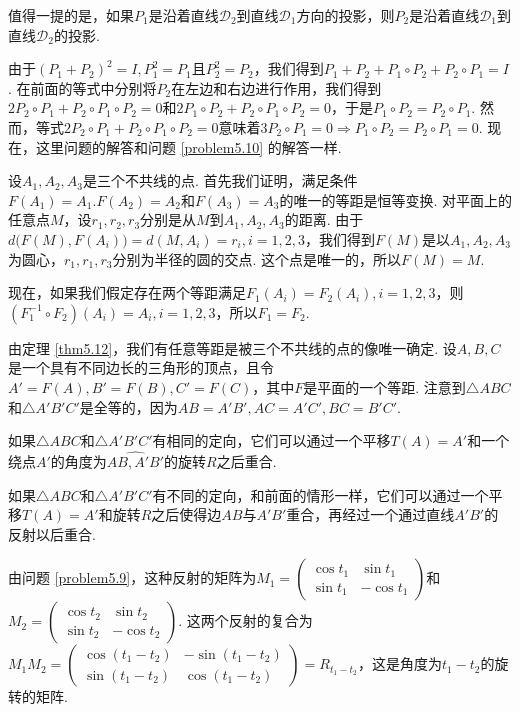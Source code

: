 \begin{remark}
  值得一提的是，如果$P_1$是沿着直线$\mathscr D_2$到直线$\mathscr D_1$方向的投影，则$P_2$是沿着直线$\mathscr D_1$到直线$\mathscr D_2$的投影.
\end{remark}

\begin{solution}
  由于$(P_1+P_2)^2=I,P_1^2=P_1$且$P_2^2=P_2$，我们得到$P_1+P_2+P_1\circ P_2+P_2\circ P_1=I$. 在前面的等式中分别将$P_2$在左边和右边进行作用，我们得到$2P_2\circ P_1+P_2\circ P_1\circ P_2=0$和$2P_1\circ P_2+P_2\circ P_1\circ P_2=0$，于是$P_1\circ P_2=P_2\circ P_1$. 然而，等式$2P_2\circ P_1+P_2\circ P_1\circ P_2=0$意味着$3P_2\circ P_1=0\Rightarrow P_1\circ P_2=P_2\circ P_1=0$. 现在，这里问题的解答和问题 \ref{problem5.10} 的解答一样.
\end{solution}

\begin{solution}
  设$A_1,A_2,A_3$是三个不共线的点. 首先我们证明，满足条件$F(A_1)=A_1.F(A_2)=A_2$和$F(A_3)=A_3$的唯一的等距是恒等变换. 对平面上的任意点$M$，设$r_1,r_2,r_3$分别是从$M$到$A_1,A_2,A_3$的距离. 由于$d\big(F(M),F(A_i)\big)=d(M,A_i)=r_i,i=1,2,3$，我们得到$F(M)$是以$A_1,A_2,A_3$为圆心，$r_1,r_1,r_3$分别为半径的圆的交点. 这个点是唯一的，所以$F(M)=M$.

  现在，如果我们假定存在两个等距满足$F_1(A_i)=F_2(A_i),i=1,2,3$，则$(F_1^{-1}\circ F_2)(A_i)=A_i,i=1,2,3$，所以$F_1=F_2$.
\end{solution}

\begin{solution}
  由定理 \ref{thm5.12}，我们有任意等距是被三个不共线的点的像唯一确定. 设$A,B,C$是一个具有不同边长的三角形的顶点，且令$A'=F(A),B'=F(B),C'=F(C)$，其中$F$是平面的一个等距.
  注意到$\triangle ABC$和$\triangle A'B'C'$是全等的，因为$AB=A'B',AC=A'C',BC=B'C'$.

  如果$\triangle ABC$和$\triangle A'B'C'$有相同的定向，它们可以通过一个平移$T(A)=A'$和一个绕点$A'$的角度为$\widehat{AB,A'B'}$的旋转$R$之后重合.

  如果$\triangle ABC$和$\triangle A'B'C'$有不同的定向，和前面的情形一样，它们可以通过一个平移$T(A)=A'$和旋转$R$之后使得边$AB$与$A'B'$重合，再经过一个通过直线$A'B'$的反射以后重合.
\end{solution}

\begin{solution}
  由问题 \ref{problem5.9}，这种反射的矩阵为$M_1=\begin{pmatrix}
    \cos t_1 & \sin t_1 \\
    \sin t_1 & -\cos t_1
  \end{pmatrix}$和$M_2=\begin{pmatrix}
    \cos t_2 & \sin t_2 \\
    \sin t_2 & -\cos t_2
  \end{pmatrix}$. 这两个反射的复合为$M_1M_2=\begin{pmatrix}
    \cos(t_1-t_2) & -\sin(t_1-t_2) \\
    \sin(t_1-t_2) & \cos (t_1-t_2)
  \end{pmatrix}=R_{t_1-t_2}$，这是角度为$t_1-t_2$的旋转的矩阵.
\end{solution}

